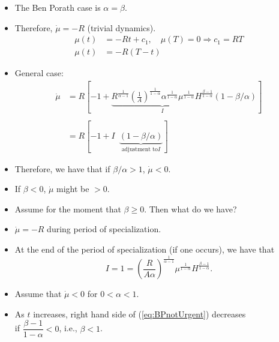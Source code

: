 \documentclass[12pt,compress,handout]{beamer}  %
\begin{document}
\begin{frame}
\begin{itemize}[<+->]

\item
The Ben Porath case is $\alpha =\beta $.

\item
Therefore, $\dot{\mu} =-R$ (trivial dynamics).
\begin{align*}
\mu (t) &= -Rt+c_{1},\quad \mu (T)=0 \Rightarrow c_{1}=RT \\
\mu (t) &= -R(T-t)
\end{align*}

\item
General case:
\begin{align*}
\dot{\mu} &= R\left[ -1+\underset{I}{\underbrace{R^{\frac{1}{\alpha
-1}}\left( \frac{1}{A}\right) ^{\frac{1}{1-\alpha }}\alpha
^{\frac{1}{1-\alpha }}\mu ^{\frac{1}{1-\alpha }}H^{\frac{\beta
-1}{1-\alpha }}}}\left(
1-\beta /\alpha \right) \right] \\
\\
&= R[-1+I\,\,\,\underset{\text{adjustment to
}I}{\underbrace{(1-\beta /\alpha )}}]
\end{align*}
\end{itemize}
\end{frame}


\begin{frame}
\begin{itemize}[<+->]
\item
Therefore, we have that if $\beta /\alpha >1$, $\dot{\mu} < 0$.
\medskip
\item
If $\beta < 0$, $\dot{\mu}$ might be $>0$.
\medskip
\item
Assume for the moment that $\beta \geq 0$. Then what do we have?
\medskip
\item
$\dot{\mu} =-R$ during period of specialization.
\end{itemize}
\end{frame}


\begin{frame}
\begin{itemize}[<+->]
\item
At the end of the period of specialization (if one occurs), we have
that
\begin{equation}
I=1=\left( \frac{R}{A\alpha }\right) ^{\frac{1}{\alpha -1}}\mu
^{\frac{1}{1-\alpha }}H^{\frac{\beta -1}{1-\alpha }}. \tag{$**$}
\label{eq:BPnotUrgent}
\end{equation}
\medskip
\item
Assume that $\dot{\mu} <0$ for $0<\alpha <1$. \medskip
\item
As $t$ increases, right hand side of (\ref{eq:BPnotUrgent})
decreases\\
if $\dfrac{\beta -1}{1-\alpha }<0$, i.e., $\beta <1$.
\end{itemize}
\end{frame}
\end{document}
